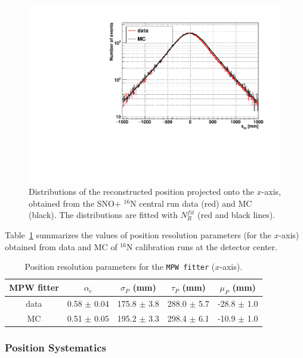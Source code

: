\begin{figure}
	\centering
	\includegraphics[width=12cm]{posResol.pdf}
	\caption[Distributions of the reconstructed position projected onto the $x$-axis.]{Distributions of the reconstructed position projected onto the $x$-axis, obtained from the SNO+ {$^{16}$}N central run data (red) and MC (black). The distributions are fitted with $N_R^{fit}$ (red and black lines).	\label{fig:posresol}}
\end{figure}

Table~\ref{tab:posresol} summarizes the values of position resolution parameters (for the $x$-axis) obtained from data and MC of {$^{16}$}N calibration runs at the detector center.
\begin{table}[ht]
	\centering
	\caption{Position resolution parameters for the \texttt{MPW fitter} ($x$-axis).	\label{tab:posresol}}
	\vspace{2mm}
	\begin{tabular}{ccccc}
		\toprule
		MPW fitter & $\alpha_e$ & $\sigma_P$ (mm) & $\tau_P$ (mm)& $\mu_P$ (mm)\\
		\midrule
		data& 0.58 $\pm$ 0.04 & 175.8 $\pm$ 3.8 & 288.0 $\pm$ 5.7 & -28.8 $\pm$ 1.0\\
		\hline 
		MC & 0.51 $\pm$ 0.05 & 195.2 $\pm$ 3.3 & 298.4 $\pm$ 6.1 & -10.9 $\pm$ 1.0\\
		\bottomrule
	\end{tabular}
\end{table}
\vspace{1mm}

\subsubsection{Position Systematics}\label{sect:posSystematics}

